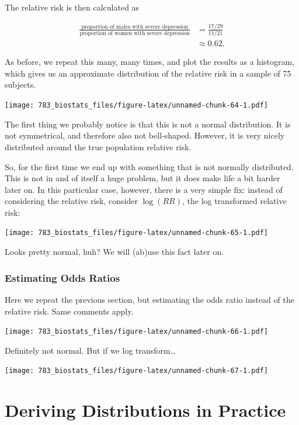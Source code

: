 \documentclass[]{book}
\theoremstyle{definition}
\theoremstyle{definition}
\theoremstyle{definition}
\theoremstyle{remark}
\begin{document}
The relative risk is then calculated as

\begin{align*}
  \frac{\text{proportion of males with severe depression}}{\text{proportion of women with severe depression}} &= \frac{17/29}{11/21} \\ & \approx 0.62.
\end{align*}

As before, we repeat this many, many times, and plot the results as a histogram, which gives us an approximate distribution of the relative risk in a sample of 75 subjects.

\texttt{[image: 783\_biostats\_files/figure-latex/unnamed-chunk-64-1.pdf]}

The first thing we probably notice is that this is not a normal distribution. It is not symmetrical, and therefore also not bell-shaped. However, it is very nicely distributed around the true population relative risk.

So, for the first time we end up with something that is not normally distributed. This is not in and of itself a huge problem, but it does make life a bit harder later on. In this particular case, however, there is a very simple fix: instead of considering the relative risk, consider \(\log(RR)\), the log transformed relative risk:

\texttt{[image: 783\_biostats\_files/figure-latex/unnamed-chunk-65-1.pdf]}

Looks pretty normal, huh? We will (ab)use this fact later on.

\hypertarget{estimating-odds-ratios}{%
\subsubsection*{Estimating Odds Ratios}\label{estimating-odds-ratios}}

Here we repeat the previous section, but estimating the odds ratio instead of the relative risk. Same comments apply.

\texttt{[image: 783\_biostats\_files/figure-latex/unnamed-chunk-66-1.pdf]}

Definitely not normal. But if we log transform\ldots{}

\texttt{[image: 783\_biostats\_files/figure-latex/unnamed-chunk-67-1.pdf]}

\hypertarget{deriving-distributions-in-practice}{%
\section{Deriving Distributions in Practice}\label{deriving-distributions-in-practice}}
\end{document}
